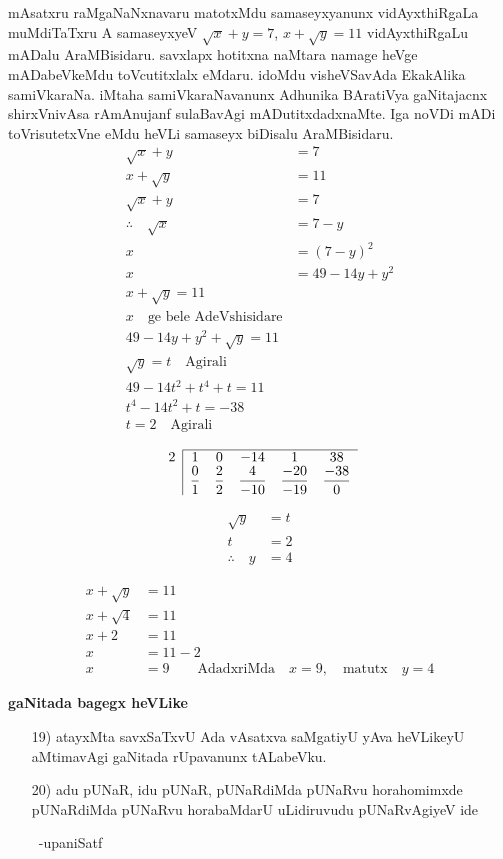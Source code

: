 mAsatxru raMgaNaNxnavaru matotxMdu samaseyxyanunx vidAyxthiRgaLa muMdiTaTxru
A samaseyxyeV \quad $\sqrt{x}+y=7$, \quad $x+\sqrt{y}=11$ \quad vidAyxthiRgaLu mADalu AraMBisidaru. savxlapx hotitxna naMtara namage heVge mADabeVkeMdu toVcutitxlalx eMdaru. idoMdu visheVSavAda EkakAlika samiVkaraNa. iMtaha samiVkaraNavanunx Adhunika BAratiVya gaNitajacnx shirxVnivAsa rAmAnujanf sulaBavAgi mADutitxdadxnaMte. Iga noVDi mADi toVrisutetxVne eMdu heVLi samaseyx biDisalu AraMBisidaru.
\begin{align*}
\sqrt{x}+y&=7 \tag{\rm 1}\\
x+\sqrt{y} &=11 \tag{\rm 2}\\
\sqrt{x}+y &=7 \tag{\rm 1}\\
\therefore \quad \sqrt{x} & =7-y\\
x&=(7-y)^2\\
x &=49-14y+y^2\\
x+\sqrt{y} =11 \tag{\rm 2}\\
x \quad \text{ge bele AdeVshisidare}\\
49-14y+y^2+\sqrt{y}=11\\
\sqrt{y}=t \quad \text{Agirali}\\
49-14t^2+t^4+t=11\\
t^4-14t^2+t=-38\\
t=2 \quad \text{Agirali}
\end{align*}

$$
\begin{array}{c|ccccc}
\cline{2-6}
2 &1 & 0 & -14 & 1  & 38\\
&\dfrac{0}{1}& \dfrac{2}{2} &\dfrac{4}{-10}& \dfrac{-20}{-19}&\dfrac{-38}{0}
\end{array}
$$

\begin{align*}
\sqrt{y} &=t\\
t&=2\\
\therefore \quad y&=4
\end{align*}

\begin{align*}
x+\sqrt{y} &=11\\
x+\sqrt{4} &=11\\
x+2 &=11\\
x &=11-2\\
x &=9 \qquad 
\text{AdadxriMda} \quad x=9, \quad \text{matutx} \quad y=4
\end{align*}

\begin{center}
{\bf gaNitada bagegx heVLike} 
\end{center}
\begin{enumerate}
\item[\rm 19)] atayxMta savxSaTxvU Ada vAsatxva saMgatiyU yAva heVLikeyU aMtimavAgi gaNitada rUpavanunx tALabeVku.

\item[\rm 20)] adu pUNaR, idu pUNaR, pUNaRdiMda pUNaRvu horahomimxde pUNaRdiMda pUNaRvu horabaMdarU uLidiruvudu pUNaRvAgiyeV ide

~\hfill -upaniSatf
\end{enumerate}
